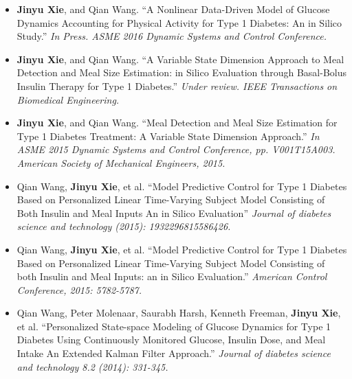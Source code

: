 \documentclass[10pt,a4paper]{article}
\begin{document}
\spacedhrule{0.5em}{-0.8em}
  
  \begin{itemize}
  \item \textbf{Jinyu Xie}, and Qian Wang. ``A Nonlinear Data-Driven Model of
    Glucose Dynamics Accounting for Physical Activity for Type 1 Diabetes: An in
    Silico Study.'' \textit{In Press. ASME 2016 Dynamic Systems and Control
    Conference.} 
  \item \textbf{Jinyu Xie}, and Qian Wang. ``A Variable State Dimension Approach
    to Meal Detection and Meal Size Estimation: in Silico Evaluation through
    Basal-Bolus Insulin Therapy for Type 1 Diabetes.'' \textit{Under review. IEEE
    Transactions on Biomedical Engineering.}
  \item \textbf{Jinyu Xie}, and Qian Wang. ``Meal Detection and Meal Size Estimation for Type 1 Diabetes Treatment: A Variable State Dimension Approach.'' \textit{In ASME 2015 Dynamic Systems and Control Conference, pp. V001T15A003. American Society of Mechanical Engineers, 2015.}
  \item Qian Wang, \textbf{Jinyu Xie}, et al. ``Model Predictive Control for Type 1 Diabetes Based on Personalized Linear Time-Varying Subject Model Consisting of Both Insulin and Meal Inputs An in Silico Evaluation'' \textit{Journal of diabetes science and technology (2015): 1932296815586426.}
  \item Qian Wang, \textbf{Jinyu Xie}, et al. ``Model Predictive Control for Type 1 Diabetes Based on Personalized Linear Time-Varying Subject Model Consisting of both Insulin and Meal Inputs: an in Silico Evaluation.'' \textit{American Control Conference, 2015: 5782-5787.}
  \item Qian Wang, Peter Molenaar, Saurabh Harsh, Kenneth Freeman, \textbf{Jinyu Xie}, et al. ``Personalized State-space Modeling of Glucose Dynamics for Type 1 Diabetes Using Continuously Monitored Glucose, Insulin Dose, and Meal Intake An Extended Kalman Filter Approach.'' \textit{Journal of diabetes science and technology 8.2 (2014): 331-345.}
  \end{itemize}
  
  
\end{document}
